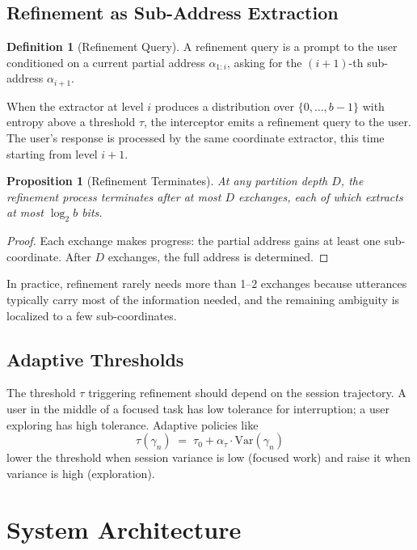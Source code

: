 \documentclass[11pt,a4paper]{article}
\newtheorem{proposition}[theorem]{Proposition}
\theoremstyle{definition}
\newtheorem{definition}[theorem]{Definition}
\theoremstyle{remark}
\begin{document}
\subsection{Refinement as Sub-Address Extraction}

\begin{definition}[Refinement Query]
A refinement query is a prompt to the user conditioned on a current partial address $\alpha_{1:i}$, asking for the $(i+1)$-th sub-address $\alpha_{i+1}$.
\end{definition}

When the extractor at level $i$ produces a distribution over $\{0,\ldots,b-1\}$ with entropy above a threshold $\tau$, the interceptor emits a refinement query to the user. The user's response is processed by the same coordinate extractor, this time starting from level $i+1$.

\begin{proposition}[Refinement Terminates]
\label{prop:ref-term}
At any partition depth $D$, the refinement process terminates after at most $D$ exchanges, each of which extracts at most $\log_2 b$ bits.
\end{proposition}

\begin{proof}
Each exchange makes progress: the partial address gains at least one sub-coordinate. After $D$ exchanges, the full address is determined.
\end{proof}

In practice, refinement rarely needs more than 1--2 exchanges because utterances typically carry most of the information needed, and the remaining ambiguity is localized to a few sub-coordinates.

\subsection{Adaptive Thresholds}

The threshold $\tau$ triggering refinement should depend on the session trajectory. A user in the middle of a focused task has low tolerance for interruption; a user exploring has high tolerance. Adaptive policies like
\[
\tau(\gamma_n) \;=\; \tau_0 + \alpha_{\tau} \cdot \mathrm{Var}(\gamma_n)
\]
lower the threshold when session variance is low (focused work) and raise it when variance is high (exploration).

\section{System Architecture}
\label{sec:arch}
\end{document}
